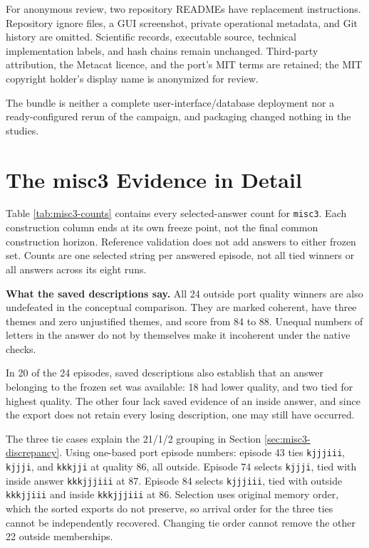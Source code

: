 \documentclass[10pt,letterpaper]{article}
\begin{document}
For anonymous review, two repository READMEs have replacement instructions. Repository
ignore files, a GUI screenshot, private operational metadata, and Git history are omitted.
Scientific records, executable source, technical implementation labels, and hash chains
remain unchanged. Third-party attribution, the Metacat licence, and the port's MIT terms
are retained; the MIT copyright holder's display name is anonymized for review.

The bundle is neither a complete user-interface/database deployment nor a ready-configured
rerun of the campaign, and packaging changed nothing in the studies.

\clearpage

\section{The misc3 Evidence in Detail}\label{app:misc3}

Table \ref{tab:misc3-counts} contains every selected-answer count for \texttt{misc3}. Each
construction column ends at its own freeze point, not the final common construction
horizon. Reference validation does not add answers to either frozen set. Counts are one
selected string per answered episode, not all tied winners or all answers across its eight
runs.



\textbf{What the saved descriptions say.} All 24 outside port quality winners are also
undefeated in the conceptual comparison. They are marked coherent, have three themes and
zero unjustified themes, and score from 84 to 88. Unequal numbers of letters in the answer
do not by themselves make it incoherent under the native checks.

In 20 of the 24 episodes, saved descriptions also establish that an answer belonging to
the frozen set was available: 18 had lower quality, and two tied for highest quality. The
other four lack saved evidence of an inside answer, and since the export does not retain
every losing description, one may still have occurred.

The three tie cases explain the 21/1/2 grouping in Section \ref{sec:misc3-discrepancy}.
Using one-based port episode numbers: episode 43 ties \texttt{kjjjiii}, \texttt{kjjji},
and \texttt{kkkjji} at quality 86, all outside. Episode 74 selects \texttt{kjjji}, tied
with inside answer \texttt{kkkjjjiii} at 87. Episode 84 selects \texttt{kjjjiii}, tied
with outside \texttt{kkkjjiii} and inside \texttt{kkkjjjiii} at 86. Selection uses
original memory order, which the sorted exports do not preserve, so arrival order for the
three ties cannot be independently recovered. Changing tie order cannot remove the other
22 outside memberships.
\end{document}

